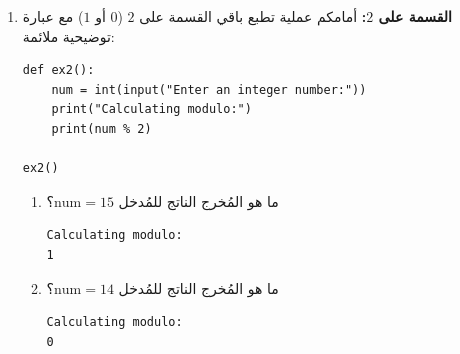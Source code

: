 \documentclass[14pt]{extarticle}
\begin{document}
\begin{enumerate}[label=\textbf{تمرين \arabic*:}, wide=0pt, itemsep=2.2em]
\ifwithsols
\begin{boxSolution}
\begin{english}
\begin{verbatim}
def ex1():
    num1 = int(input("Enter number: "))
    num2 = int(input("Enter number: "))
    print("num1 // num2 :", num1 // num2)
    print("num1 / num2 :", num1 / num2)
    print("num1 % num2 :", num1 % num2)

ex1()
\end{verbatim}
\end{english}
\end{boxSolution}
\fi
\filbreak

\item \textbf{القسمة على $2$:} أمامكم عملية تطبع باقي القسمة على $2$ ($0$ أو $1$) مع عبارة توضيحية ملائمة:

\begin{boxCode}
\begin{english}
\begin{verbatim}
def ex2():
    num = int(input("Enter an integer number:"))
    print("Calculating modulo:")
    print(num % 2)

ex2()
\end{verbatim}
\end{english}
\end{boxCode}

\begin{enumerate}[label=\alph*.]
\item ما هو المُخرج الناتج للمُدخل $\text{num} = 15$؟
\ifwithsols
\begin{boxSolution}
\begin{english}
\begin{verbatim}
Calculating modulo:
1
\end{verbatim}
\end{english}
\end{boxSolution}
\fi
\filbreak

\item ما هو المُخرج الناتج للمُدخل $\text{num} = 14$؟
\ifwithsols
\begin{boxSolution}
\begin{english}
\begin{verbatim}
Calculating modulo:
0
\end{verbatim}
\end{english}
\end{boxSolution}
\fi
\filbreak
\end{enumerate}
\filbreak


\end{enumerate}
\end{document}
